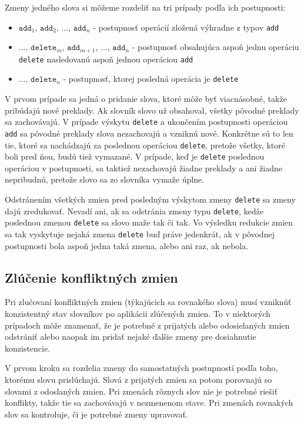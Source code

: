 \documentclass[
  digital, %
  table,   %
  lof,     %
  lot,     %
]{fithesis3}
\begin{document}
Zmeny jedného slova si môžeme rozdeliť na tri prípady podľa ich postupnosti:
\begin{itemize}
\item $\texttt{add}_1$, $\texttt{add}_2$, ..., $\texttt{add}_n$ - postupnosť operácií zložená výhradne z typov \texttt{add}
\item ..., $\texttt{delete}_{m}$, $\texttt{add}_{m+1}$, ..., $\texttt{add}_n$ - postupnosť obsahujúca aspoň jednu operáciu \texttt{delete} nasledovanú aspoň jednou operáciou \texttt{add}
\item ..., $\texttt{delete}_{n}$ - postupnosť, ktorej posledná operácia je \texttt{delete}
\end{itemize}

V prvom prípade sa jedná o pridanie slova, ktoré môže byť viacnásobné, takže pribúdajú nové preklady. Ak slovník slovo už obsahoval, všetky pôvodné preklady sa zachovávajú. V prípade výskytu \texttt{delete} a ukončením postupnosti operáciou \texttt{add} sa pôvodné preklady slova nezachovajú a vzniknú nové. Konkrétne sú to len tie, ktoré sa nachádzajú za poslednou operáciou \texttt{delete}, pretože všetky, ktoré boli pred ňou, budú tiež vymazané. V prípade, keď je \texttt{delete} poslednou operáciou v postupnosti, sa taktiež nezachovajú žiadne preklady a ani žiadne nepribudnú, pretože slovo sa zo slovníka vymaže úplne.

Odstránením všetkých zmien pred posledným výskytom zmeny \texttt{delete} sa zmeny dajú zredukovať. Nevadí ani, ak sa odstránia zmeny typu \texttt{delete}, kedže poslednou zmenou \texttt{delete} sa slovo maže tak či tak. Vo výsledku redukcie zmien sa tak vyskytuje nejaká zmena \texttt{delete} buď práve jedenkrát, ak v pôvodnej postupnosti bola aspoň jedna taká zmena, alebo ani raz, ak nebola.

\subsection{Zlúčenie konfliktných zmien}
Pri zlučovaní konfliktných zmien (týkajúcich sa rovnakého slova) musí vzniknúť konzistentný stav slovníkov po aplikácii zlúčených zmien. To v niektorých prípadoch môže znamenať, že je potrebné z prijatých alebo odosielaných zmien odstrániť alebo naopak im pridať nejaké ďalšie zmeny pre dosiahnutie konzistencie.

V prvom kroku sa rozdelia zmeny do samostatných postupností podľa toho, ktorému slovu prislúchajú. Slová z prijatých zmien sa potom porovnajú so slovami z odoslaných zmien. Pri zmenách rôznych slov nie je potrebné riešiť konflikty, takže tie sa zachovávajú v nezmenenom stave. Pri zmenách rovnakých slov sa kontroluje, či je potrebné zmeny upravovať.
\end{document}
